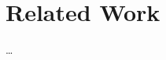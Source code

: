 
\chapter{Related Work}\label{ch:related-work} %



\ifpdf
    \graphicspath{{7/figures/PNG/}{7/figures/PDF/}{7/figures/}}
\else
    \graphicspath{{7/figures/EPS/}{7/figures/}}
\fi


% 

\dots



